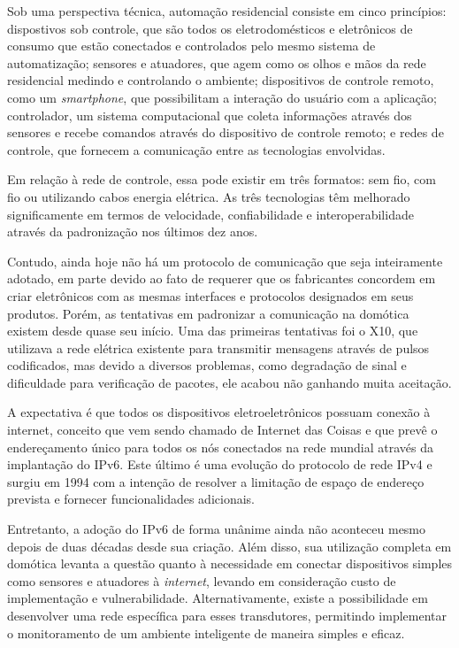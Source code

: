 \documentclass[
    12pt,               %
    a4paper,            %
    english,            %
    brazil,             %
    ]{article}
\begin{document}
Sob uma perspectiva técnica, automação residencial consiste em cinco princípios: dispostivos sob controle, que são todos os
eletrodomésticos e eletrônicos de consumo que estão conectados e controlados pelo mesmo sistema de automatização; sensores e
atuadores, que agem como os olhos e mãos da rede residencial medindo e controlando o ambiente; dispositivos de controle remoto,
como um \textit{smartphone}, que possibilitam a interação do usuário com a aplicação; controlador, um sistema computacional que
coleta informações através dos sensores e recebe comandos através do dispositivo de controle remoto; e redes de controle, que
fornecem a comunicação entre as tecnologias envolvidas. \cite{kyas2013}

Em relação à rede de controle, essa pode existir em três formatos: sem fio, com fio ou utilizando cabos energia elétrica. As três
tecnologias têm melhorado significamente em termos de velocidade, confiabilidade e interoperabilidade através da padronização nos
últimos dez anos. \cite{kyas2013}

Contudo, ainda hoje não há um protocolo de comunicação que seja inteiramente adotado, em parte devido ao fato de requerer que os
fabricantes concordem em criar eletrônicos com as mesmas interfaces e protocolos designados em seus produtos. Porém, as tentativas
em padronizar a comunicação na domótica existem desde quase seu início. Uma das primeiras tentativas foi o X10, que utilizava a
rede elétrica existente para transmitir mensagens através de pulsos codificados, mas devido a diversos problemas, como degradação
de sinal e dificuldade para verificação de pacotes, ele acabou não ganhando muita aceitação. \cite{riley2012}

A expectativa é que todos os dispositivos eletroeletrônicos possuam conexão à internet, conceito que vem sendo chamado de Internet
das Coisas e que prevê o endereçamento único para todos os nós conectados na rede mundial através da implantação do IPv6. Este
último é uma evolução do protocolo de rede IPv4 e surgiu em 1994 com a intenção de resolver a limitação de espaço de endereço
prevista e fornecer funcionalidades adicionais. \cite{hagen2002}

Entretanto, a adoção do IPv6 de forma unânime ainda não aconteceu mesmo depois de duas décadas desde sua criação. Além disso, sua
utilização completa em domótica levanta a questão quanto à necessidade em conectar dispositivos simples como sensores e atuadores
à \textit{internet}, levando em consideração custo de implementação e vulnerabilidade. Alternativamente, existe a possibilidade em
desenvolver uma rede específica para esses transdutores, permitindo implementar o monitoramento de um ambiente inteligente de
maneira simples e eficaz.
\end{document}
